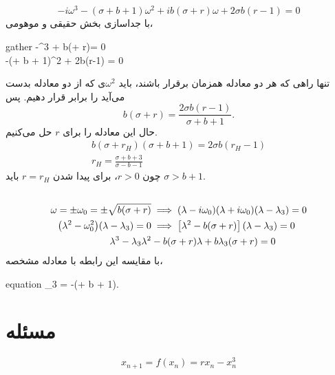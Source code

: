 \documentclass[12pt,a4paper]{article}
\begin{document}
	\subsection{}
	\begin{equation}
		-i\omega^3 - (\sigma + b + 1)\omega^2 + ib(\sigma + r)\omega + 2\sigma b(r-1) = 0
	\end{equation}
	با جداسازی بخش حقیقی و موهومی،
	\begin{empheq}[left=\empheqlbrace]{gather}
		-\omega^3 + b(\sigma + r)\omega = 0 \\
		-(\sigma + b + 1)\omega^2 + 2\sigma b(r-1) = 0
	\end{empheq}
	تنها راهی که هر دو معادله همزمان برقرار باشند، باید $\omega^2 $ی که از دو معادله بدست می‌آید را برابر قرار دهیم. پس
	\begin{equation}
		b(\sigma + r) = \frac{2\sigma b(r-1)}{\sigma + b + 1}.
	\end{equation}
	حال این معادله را برای $r$ حل می‌کنیم.
	\begin{gather}
		b(\sigma + r_H)(\sigma + b + 1) = 2\sigma b(r_H - 1) \\
		r_H = \frac{\sigma + b + 3}{\sigma - b - 1}
	\end{gather}
	چون $r>0 $، برای پیدا شدن $r = r_H$ باید $\sigma > b + 1 $.
	\subsection{}
	\begin{align}
		\omega = \pm\omega_0 = \pm\sqrt{b(\sigma + r)}
		&\implies (\lambda - i\omega_0)(\lambda + i\omega_0)(\lambda - \lambda_3) = 0 \\
		\qty(\lambda^2 - \omega_0^2)(\lambda - \lambda_3) = 0
		&\implies \qty[\lambda^2 - b(\sigma + r)](\lambda - \lambda_3) = 0 \\
		\lambda^3 - \lambda_3\lambda^2 &- b(\sigma + r)\lambda + b\lambda_3(\sigma + r) = 0
	\end{align}
	با مقایسه این رابطه با معادله مشخصه،
	\begin{empheq}[box=\fbox]{equation}
		\lambda_3 = -(\sigma + b + 1).
	\end{empheq}

	\section{مسئله }
	\begin{equation}
		x_{n+1} = f(x_n) = rx_n - x_n^3
	\end{equation}
\end{document}
